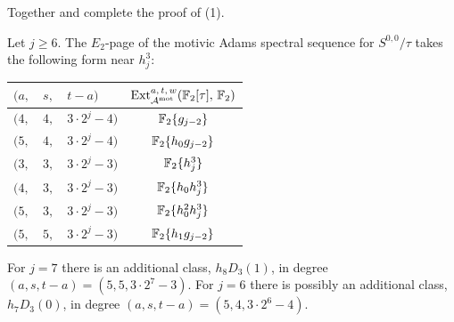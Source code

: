 Together  and  complete the proof of (1).

\begin{lem} \label{lem:weak CE E2}
  Let $j \geq 6$. 
  The $E_2$-page of the motivic Adams spectral sequence for $S^{0,0}/\tau$
  takes the following form near $h_{j}^3$:
  \begin{center}{\renewcommand{\arraystretch}{1.2}
      \begin{tabular}{|lll|c|}\hline
        $(a,$ & $s,$ & $t-a)$ & $\operatorname{\mathrm{Ext}}^{a,\,t,\,w}_{\operatorname{\mathcal{A}}^\textup{mot}}(\mathbb{F}_2[\tau],\, \mathbb{F}_2)$ \\\hline\hline
        $(4,$ & $4,$ & $ 3 \cdot 2^j-4)$ & $\operatorname{\mathbb{F}}_2\{g_{j-2}\}$ \\\hline
        $(5,$ & $4,$ & $ 3 \cdot 2^j-4)$ & $\operatorname{\mathbb{F}}_2\{h_0g_{j-2}\} $ \\\hline
        $(3,$ & $3,$ & $ 3 \cdot 2^j-3)$ & $\operatorname{\mathbb{F}}_2\{h_j^3\}$ \\\hline
        $(4,$ & $3,$ & $ 3 \cdot 2^j-3)$ & $\operatorname{\mathbb{F}}_2\{h_0h_j^3\}$ \\\hline
        $(5,$ & $3,$ & $ 3 \cdot 2^j-3)$ & $\operatorname{\mathbb{F}}_2\{h_0^2h_j^3\}$ \\\hline    
        $(5,$ & $5,$ & $ 3 \cdot 2^j-3)$ & $\operatorname{\mathbb{F}}_2\{h_1g_{j-2}\}$ \\\hline          
      \end{tabular}}
  \end{center}
  For $j=7$ there is an additional class, $h_8D_3(1)$, in degree $(a,s,t-a)=(5,5, 3 \cdot 2^7 - 3)$.
  For $j=6$ there is possibly an additional class, $h_7D_3(0)$, in degree $(a,s,t-a)=(5,4, 3 \cdot 2^6 - 4)$.
\end{lem}

